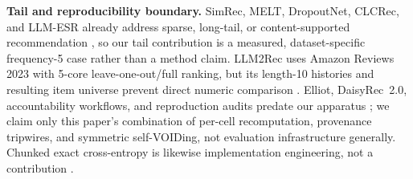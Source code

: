 \textbf{Tail and reproducibility boundary.} SimRec, MELT, DropoutNet, CLCRec, and LLM-ESR already address sparse, long-tail, or content-supported recommendation \citep{brody2024simrec,kim2023melt,volkovs2017dropoutnet,wei2021clcrec,liu2024llmesr}, so our tail contribution is a measured, dataset-specific frequency-5 case rather than a method claim. LLM2Rec uses Amazon Reviews 2023 with 5-core leave-one-out/full ranking, but its length-10 histories and resulting item universe prevent direct numeric comparison \citep{he2025llm2rec}. Elliot, DaisyRec~2.0, accountability workflows, and reproduction audits predate our apparatus \citep{anelli2021elliot,sun2022daisyrec,bellogin2021accountability,petrov2022bert4rec}; we claim only this paper's combination of per-cell recomputation, provenance tripwires, and symmetric self-VOIDing, not evaluation infrastructure generally. Chunked exact cross-entropy is likewise implementation engineering, not a contribution \citep{wijmans2025cce}.
